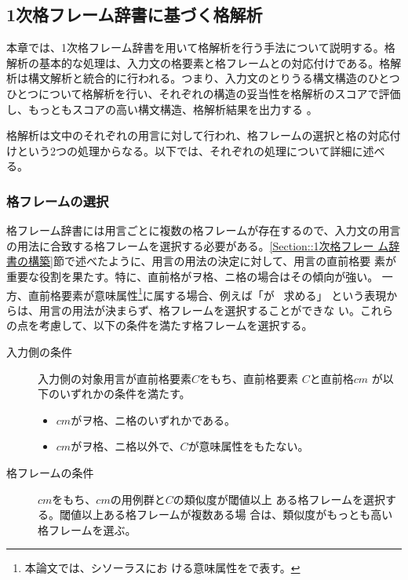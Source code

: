 \documentclass[fleqn]{nlp}
\newcommand{\sm}[1]{}
\begin{document}
\subsection{1次格フレーム辞書に基づく格解析} \label{章::格解析}

本章では、1次格フレーム辞書を用いて格解析を行う手法について説明する。格
解析の基本的な処理は、入力文の格要素と格フレームとの対応付けである。格解
析は構文解析と統合的に行われる。つまり、入力文のとりうる構文構造のひとつ
ひとつについて格解析を行い、それぞれの構造の妥当性を格解析のスコアで評価
し、もっともスコアの高い構文構造、格解析結果を出力する
\cite{Kuro-IEICE1994}。

格解析は文中のそれぞれの用言に対して行われ、格フレームの選択と格の対応付
けという2つの処理からなる。以下では、それぞれの処理について詳細に述べる。


\subsubsection{格フレームの選択}

格フレーム辞書には用言ごとに複数の格フレームが存在するので、入力文の用言
の用法に合致する格フレームを選択する必要がある。\ref{Section::1次格フレー
ム辞書の構築}節で述べたように、用言の用法の決定に対して、用言の直前格要
素が重要な役割を果たす。特に、直前格がヲ格、ニ格の場合はその傾向が強い。
一方、直前格要素が意味属性\sm{主体}\footnote{本論文では、シソーラスにお
ける意味属性を\sm{}で表す。}に属する場合、例えば「\sm {主体}が \ 求める」
という表現からは、用言の用法が決まらず、格フレームを選択することができな
い。これらの点を考慮して、以下の条件を満たす格フレームを選択する。
\begin{description}
 \item[入力側の条件] 入力側の対象用言が直前格要素$C$をもち、直前格要素
	    $C$と直前格$cm$ が以下のいずれかの条件を満たす。\label{格フ
	    レーム選択アルゴリズム::直前条件}
	    \begin{itemize}
	     \item $cm$がヲ格、ニ格のいずれかである。
	     \item $cm$がヲ格、ニ格以外で、$C$が意味属性\sm{主体}をもたない。
	    \end{itemize}
 \item[格フレームの条件] $cm$をもち、$cm$の用例群と$C$の類似度が閾値以上
	    ある格フレームを選択する。閾値以上ある格フレームが複数ある場
	    合は、類似度がもっとも高い格フレームを選ぶ。
\end{description}

\vspace*{1ex}
\end{document}
